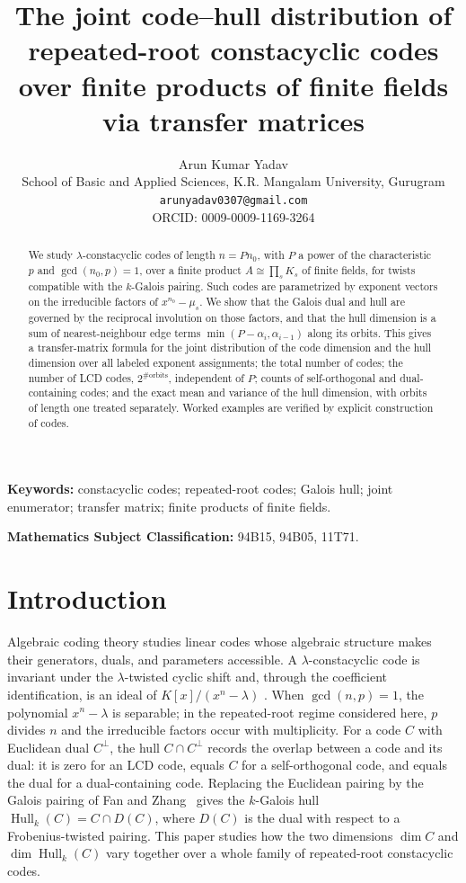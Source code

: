 \documentclass[11pt]{article}
\title{The joint code--hull distribution of repeated-root constacyclic codes
over finite products of finite fields via transfer matrices}
\author{Arun Kumar Yadav\\ School of Basic and Applied Sciences, K.R. Mangalam University, Gurugram\\ \texttt{arunyadav0307@gmail.com}\\ ORCID: 0009-0009-1169-3264}
\date{}
\theoremstyle{definition}
\theoremstyle{remark}
\newcommand{\Hull}{\operatorname{Hull}}
\begin{document}
\maketitle

\begin{abstract}
We study \(\lambda\)-constacyclic codes of length \(n = P n_0\), with
\(P\) a power of the characteristic \(p\) and \(\gcd(n_0, p) = 1\), over a
finite product \(A \cong \prod_s K_s\) of finite fields, for twists
compatible with the \(k\)-Galois pairing. Such codes are parametrized by
exponent vectors on the irreducible factors of \(x^{n_0} - \mu_s\). We
show that the Galois dual and hull are governed by the reciprocal
involution on those factors, and that the hull dimension is a sum of
nearest-neighbour edge terms \(\min(P - \alpha_i, \alpha_{i-1})\) along
its orbits. This gives a transfer-matrix formula for the joint
distribution of the code dimension and the hull dimension over all
labeled exponent assignments; the total number of codes; the number of
LCD codes, \(2^{\#\mathrm{orbits}}\), independent of \(P\); counts of
self-orthogonal and dual-containing codes; and the exact mean and
variance of the hull dimension, with orbits of length one treated
separately. Worked examples are verified by explicit construction of
codes.
\end{abstract}

\noindent\textbf{Keywords:} constacyclic codes; repeated-root codes;
Galois hull; joint enumerator; transfer matrix; finite products of finite fields.

\noindent\textbf{Mathematics Subject Classification:} 94B15, 94B05, 11T71.

\section{Introduction}

Algebraic coding theory studies linear codes whose algebraic structure
makes their generators, duals, and parameters accessible. A
\(\lambda\)-constacyclic code is invariant under the
\(\lambda\)-twisted cyclic shift and, through the coefficient
identification, is an ideal of \(K[x]/(x^n-\lambda)\)
\cite{HP2003, MS1977}. When \(\gcd(n,p)=1\), the polynomial
\(x^n-\lambda\) is separable; in the repeated-root regime considered
here, \(p\) divides \(n\) and the irreducible factors occur with
multiplicity. For a code \(C\) with Euclidean dual \(C^\perp\), the
hull \(C \cap C^\perp\) records the overlap between a code and its
dual: it is zero for an LCD code, equals \(C\) for a self-orthogonal
code, and equals the dual for a dual-containing code. Replacing the
Euclidean pairing by the Galois pairing of Fan and
Zhang~\cite{FZ2017} gives the \(k\)-Galois hull
\(\Hull_k(C) = C \cap D(C)\), where \(D(C)\) is the dual with respect
to a Frobenius-twisted pairing. This paper studies how the two
dimensions \(\dim C\) and \(\dim \Hull_k(C)\) vary together over a
whole family of repeated-root constacyclic codes.
\end{document}
